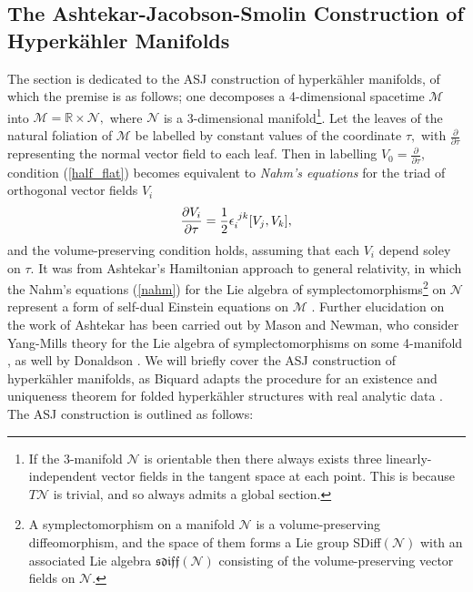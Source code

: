 \documentclass[a4paper,12pt, onecolumn, notitlepage]{article}
\theoremstyle{definition}
\theoremstyle{remark}
\newcommand{\e}{\epsilon}
\newcommand{\ddt}[1]{\frac{\partial #1}{\partial \tau}}
\newcommand{\dd}[2]{\frac{\partial #1}{\partial #2}}
\newcommand{\HK}{hyperk\"ahler }
\newcommand{\R}{\mathbb{R}}
\begin{document}
\subsection{The Ashtekar-Jacobson-Smolin Construction of Hyperk\"ahler Manifolds}
The section is dedicated to the ASJ construction of \HK manifolds, of which the premise is as follows; one decomposes a 4-dimensional spacetime $\mathcal{M}$ into $\mathcal{M}=\R\times \mathcal{N},$ where $\mathcal{N}$ is a 3-dimensional manifold\footnote{If the 3-manifold $\mathcal{N}$ is orientable then there always exists three linearly-independent vector fields in the tangent space at each point. This is because $T\mathcal{N}$ is trivial, and so always admits a global section.}. Let the leaves of the natural foliation of $\mathcal{M}$ be labelled by constant values of the coordinate $\tau,$ with $\ddt{}$ representing the normal vector field to each leaf. Then in labelling $V_{0}=\ddt{},$ condition (\ref{half_flat}) becomes equivalent to \emph{Nahm's equations} for the triad of orthogonal vector fields $V_{i}$
\begin{equation}
\label{nahm}
\dd{V_{i}}{\tau} = \frac{1}{2}\e\indices{_i^j^k}[V_{j},V_{k}],
\end{equation}
and the volume-preserving condition holds, assuming that each $V_{i}$ depend soley on $\tau.$ It was from Ashtekar's Hamiltonian approach to general relativity, in which the Nahm's equations (\ref{nahm}) for the Lie algebra of symplectomorphisms\footnote{A symplectomorphism on a manifold $\mathcal{N}$ is a  volume-preserving diffeomorphism, and the space of them forms a Lie group  SDiff$(\mathcal{N})$ with an associated Lie algebra $\mathfrak{sdiff}(\mathcal{N})$ consisting of the volume-preserving vector fields on $\mathcal{N}.$} on $\mathcal{N}$ represent a form of self-dual Einstein equations on $\mathcal{M}$ \cite{ashtekar_1987}. Further elucidation on the work of Ashtekar has been carried out by Mason and Newman, who consider Yang-Mills theory for the Lie algebra of symplectomorphisms on some 4-manifold \cite{mason_1989}, as well by Donaldson \cite{donaldson}. We will briefly cover the ASJ construction of \HK manifolds, as Biquard adapts the procedure for an existence and uniqueness theorem for folded \HK structures with real analytic data \cite{biquard_2015}.\\
The ASJ construction is outlined as follows:\\
\end{document}

